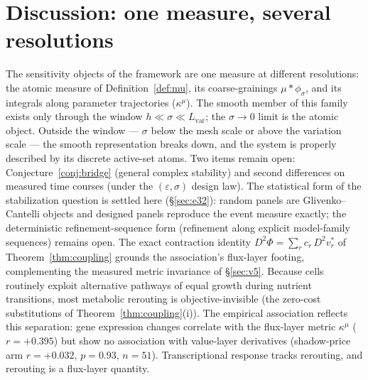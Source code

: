 \documentclass[11pt,a4paper]{article}
\theoremstyle{plain}
\theoremstyle{definition}
\theoremstyle{remark}
\newcommand{\kmu}{\kappa^{\mu}}
\begin{document}
\section{Discussion: one measure, several resolutions}
\label{sec:discussion}

The sensitivity objects of the framework are one measure at different
resolutions: the atomic measure of Definition~\ref{def:mu}, its
coarse-grainings $\mu * \phi_\sigma$, and its integrals along parameter
trajectories ($\kmu$). The smooth member of this family exists only
through the window $h \ll \sigma \ll L_{\mathrm{var}}$; the
$\sigma \to 0$ limit is the atomic object. Outside the window ---
$\sigma$ below the mesh scale or above the variation scale --- the
smooth representation breaks down, and the system is properly
described by its discrete active-set atoms. Two items remain open:
Conjecture~\ref{conj:bridge} (general complex stability) and second
differences on measured time courses (under the $(\varepsilon,
\sigma)$ design law). The statistical form of the stabilization
question is settled here (\S\ref{sec:e32}): random panels are
Glivenko--Cantelli objects and designed panels reproduce the event
measure exactly; the deterministic refinement-sequence form
(refinement along explicit model-family sequences) remains open.
The exact contraction identity
$D^2\Phi = \sum_r c_r\, D^2 v^*_r$ of Theorem~\ref{thm:coupling}
grounds the association's flux-layer footing, complementing the
measured metric invariance of \S\ref{sec:v5}. Because cells routinely
exploit alternative pathways of equal growth during nutrient
transitions, most metabolic rerouting is objective-invisible (the
zero-cost substitutions of Theorem~\ref{thm:coupling}(i)). The
empirical association reflects this separation: gene expression
changes correlate with the flux-layer metric $\kmu$ ($r = +0.395$)
but show no association with value-layer derivatives (shadow-price
arm $r = +0.032$, $p = 0.93$, $n = 51$). Transcriptional response
tracks rerouting, and rerouting is a flux-layer quantity.
\end{document}
